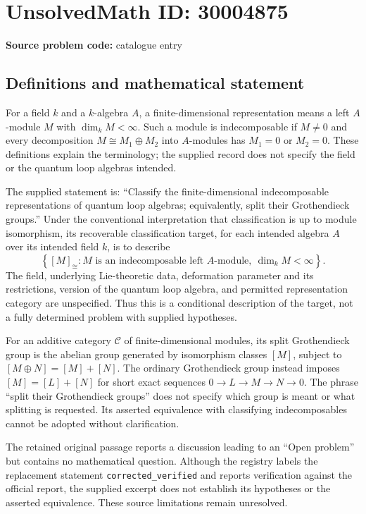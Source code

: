 \documentclass[11pt]{article}
\begin{document}
\section*{UnsolvedMath ID: 30004875}
\textbf{Source problem code:} catalogue entry
\subsection{Definitions and mathematical statement}
For a field \(k\) and a \(k\)-algebra \(A\), a finite-dimensional representation means a left \(A\)-module \(M\) with \(\dim_k M<\infty\). Such a module is indecomposable if \(M\ne 0\) and every decomposition \(M\cong M_1\oplus M_2\) into \(A\)-modules has \(M_1=0\) or \(M_2=0\). These definitions explain the terminology; the supplied record does not specify the field or the quantum loop algebras intended.

The supplied statement is: ``Classify the finite-dimensional indecomposable representations of quantum loop algebras; equivalently, split their Grothendieck groups.'' Under the conventional interpretation that classification is up to module isomorphism, its recoverable classification target, for each intended algebra \(A\) over its intended field \(k\), is to describe
\[
\left\{[M]_{\cong}: M\text{ is an indecomposable left }A\text{-module},\ \dim_k M<\infty\right\}.
\]
The field, underlying Lie-theoretic data, deformation parameter and its restrictions, version of the quantum loop algebra, and permitted representation category are unspecified. Thus this is a conditional description of the target, not a fully determined problem with supplied hypotheses.

For an additive category \(\mathcal C\) of finite-dimensional modules, its split Grothendieck group is the abelian group generated by isomorphism classes \([M]\), subject to \([M\oplus N]=[M]+[N]\). The ordinary Grothendieck group instead imposes \([M]=[L]+[N]\) for short exact sequences \(0\to L\to M\to N\to0\). The phrase ``split their Grothendieck groups'' does not specify which group is meant or what splitting is requested. Its asserted equivalence with classifying indecomposables cannot be adopted without clarification.

The retained original passage reports a discussion leading to an ``Open problem'' but contains no mathematical question. Although the registry labels the replacement statement \texttt{corrected\_verified} and reports verification against the official report, the supplied excerpt does not establish its hypotheses or the asserted equivalence. These source limitations remain unresolved.
\end{document}
